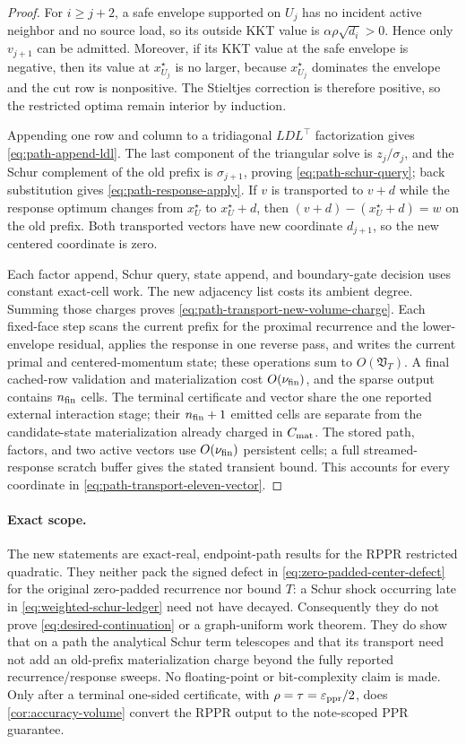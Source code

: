 \begin{proof}
For $i\geq j+2$, a safe envelope supported on $U_j$ has no incident active
neighbor and no source load, so its outside KKT value is
$\alpha\rho\sqrt{d_i}>0$.  Hence only $v_{j+1}$ can be admitted.  Moreover,
if its KKT value at the safe envelope is negative, then its value at
$x_{U_j}^\star$ is no larger, because
$x_{U_j}^\star$ dominates the envelope and the cut row is nonpositive.
The Stieltjes correction is therefore positive, so the restricted optima
remain interior by induction.

Appending one row and column to a tridiagonal $LDL^\top$ factorization gives
\cref{eq:path-append-ldl}.  The last component of the triangular solve is
$z_j/\sigma_j$, and the Schur complement of the old prefix is
$\sigma_{j+1}$, proving \cref{eq:path-schur-query}; back substitution gives
\cref{eq:path-response-apply}.  If $v$ is transported to $v+d$ while the
response optimum changes from $x_U^\star$ to $x_U^\star+d$, then
$(v+d)-(x_U^\star+d)=w$ on the old prefix.  Both transported vectors have new
coordinate $d_{j+1}$, so the new centered coordinate is zero.

Each factor append, Schur query, state append, and boundary-gate decision uses
constant exact-cell work.  The new adjacency list costs its ambient degree.
Summing those charges proves \cref{eq:path-transport-new-volume-charge}.
Each fixed-face step scans the current prefix for the proximal recurrence and
the lower-envelope residual, applies the response in one reverse pass, and
writes the current primal and centered-momentum state; these operations sum
to $O(\mathfrak V_T)$.  A final cached-row validation and materialization cost
$O(\nu_{\rm fin})$, and the sparse output contains $n_{\rm fin}$ cells.
The terminal certificate and vector share the one reported external
interaction stage; their $n_{\rm fin}+1$ emitted cells are separate from the
candidate-state materialization already charged in $C_{\rm mat}$.
The stored path, factors, and two active vectors use $O(\nu_{\rm fin})$
persistent cells; a full streamed-response scratch buffer gives the stated
transient bound.  This accounts for every coordinate in
\cref{eq:path-transport-eleven-vector}.
\end{proof}

\paragraph{Exact scope.}
The new statements are exact-real, endpoint-path results for the RPPR
restricted quadratic.  They neither pack the signed defect in
\cref{eq:zero-padded-center-defect} for the original zero-padded recurrence
nor bound $T$: a Schur shock occurring late in
\cref{eq:weighted-schur-ledger} need not have decayed.  Consequently they do
not prove \cref{eq:desired-continuation} or a graph-uniform work theorem.
They do show that on a path the analytical Schur term telescopes and that its
transport need not add an old-prefix materialization charge beyond the fully
reported recurrence/response sweeps.  No floating-point or bit-complexity
claim is made.  Only after a terminal one-sided certificate, with
$\rho=\tau=\varepsilon_{\mathrm{ppr}}/2$, does \cref{cor:accuracy-volume} convert the RPPR output
to the note-scoped PPR guarantee.
